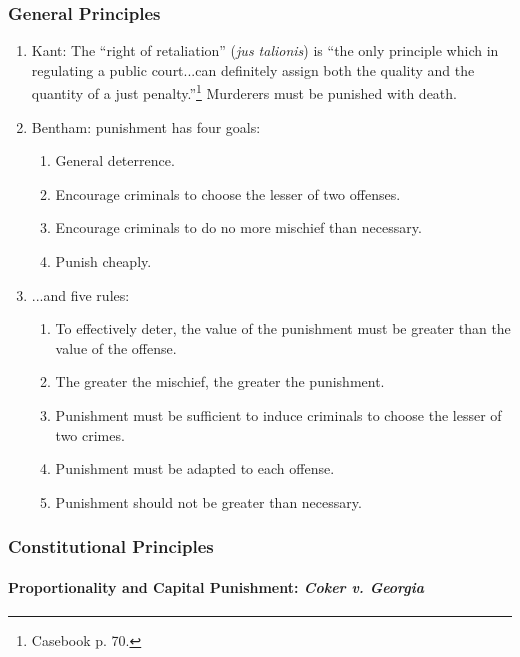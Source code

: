 \subsubsection{General Principles}

\begin{enumerate}
    \item Kant: The ``right of retaliation'' (\emph{jus talionis}) is ``the 
    only principle which in regulating a public court...can definitely assign 
    both the quality and the quantity of a just penalty.''\footnote{Casebook 
    p. 70.} Murderers must be punished with death.
    \item Bentham: punishment has four goals:
    \begin{enumerate}
        \item General deterrence.
        \item Encourage criminals to choose the lesser of two offenses.
        \item Encourage criminals to do no more mischief than necessary.
        \item Punish cheaply.
    \end{enumerate}
    \item ...and five rules:
    \begin{enumerate}
        \item To effectively deter, the value of the punishment must be 
        greater than the value of the offense.
        \item The greater the mischief, the greater the punishment.
        \item Punishment must be sufficient to induce criminals to choose the 
        lesser of two crimes.
        \item Punishment must be adapted to each offense.
        \item Punishment should not be greater than necessary.
    \end{enumerate}
\end{enumerate}

\subsubsection{Constitutional Principles}

\paragraph{Proportionality and Capital Punishment: \emph{Coker v. Georgia}}

